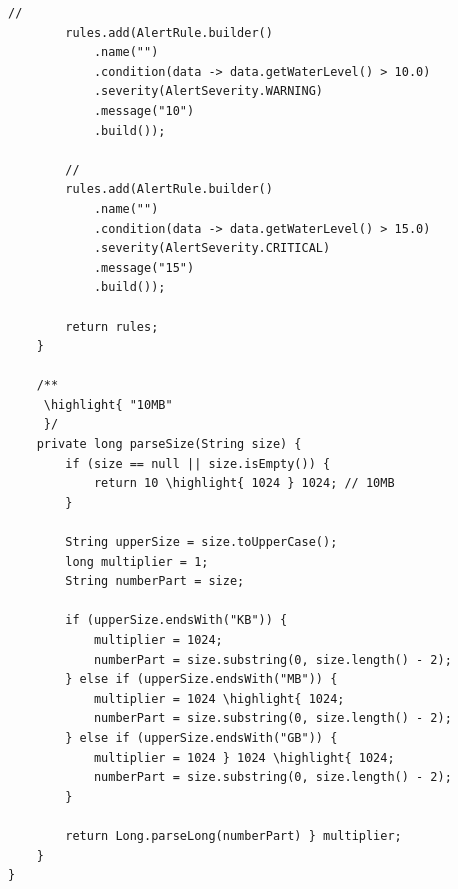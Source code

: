 \begin{lstlisting}[style=java]
        // 
        rules.add(AlertRule.builder()
            .name("")
            .condition(data -> data.getWaterLevel() > 10.0)
            .severity(AlertSeverity.WARNING)
            .message("10")
            .build());
        
        // 
        rules.add(AlertRule.builder()
            .name("")
            .condition(data -> data.getWaterLevel() > 15.0)
            .severity(AlertSeverity.CRITICAL)
            .message("15")
            .build());
        
        return rules;
    }
    
    /**
     \highlight{ "10MB"
     }/
    private long parseSize(String size) {
        if (size == null || size.isEmpty()) {
            return 10 \highlight{ 1024 } 1024; // 10MB
        }
        
        String upperSize = size.toUpperCase();
        long multiplier = 1;
        String numberPart = size;
        
        if (upperSize.endsWith("KB")) {
            multiplier = 1024;
            numberPart = size.substring(0, size.length() - 2);
        } else if (upperSize.endsWith("MB")) {
            multiplier = 1024 \highlight{ 1024;
            numberPart = size.substring(0, size.length() - 2);
        } else if (upperSize.endsWith("GB")) {
            multiplier = 1024 } 1024 \highlight{ 1024;
            numberPart = size.substring(0, size.length() - 2);
        }
        
        return Long.parseLong(numberPart) } multiplier;
    }
}
\end{lstlisting}

\important{}

